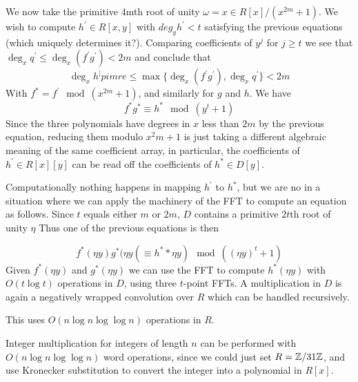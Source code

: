 We now take the primitive 4mth root of unity $\omega = x \in R[x] / (x^{2m} + 1)$. We wish to compute $h^\prime \in R[x, y]$ with $deg_y h^\prime < t$ satisfying the previous equations (which uniquely determines it?). Comparing coefficients of $y^j$ for $j \ge t$ we see that $\deg_x q^\prime \le \deg_x (f^\prime g^\prime) < 2m$ and conclude that 
\[
    \deg_x h^|pimre \le \max \{ \deg_x(f^\prime g^\prime), \deg_x q^\prime \} < 2m
\]
With $f^\ast = f^\prime \mod (x^{2m} + 1)$, and similarly for $g$ and $h$. We have
\[
    f^\ast g^\ast \equiv h^\ast \mod (y^t + 1) 
\]
Since the three polynomials have degrees in $x$ less than $2m$ by the previous equation, reducing them modulo $x^2m + 1$ is just taking a different algebraic meaning of the same coefficient array, in particular, the coefficients of $h^\prime \in R[x][y]$ can be read off the coefficients of $h^\ast \in D[y]$.

Computationally nothing happens in mapping $h^\prime$ to $h^\ast$, but we are no in a situation where we can apply the machinery of the FFT to compute an equation as follows. Since $t$ equals either $m$ or $2m$, $D$ contains a primitive $2t$th root of unity $\eta$
Thus one of the previous equations is then

\[
    f^\ast(\eta y)g^\ast(\eta y( \equiv h^\ast*\eta y) \mod ((\eta y)^t + 1)
\]
Given $f^\ast(\eta y)$ and $g^\ast(\eta y)$ we can use the FFT to compute $h^\ast(\eta y)$ with $O(t \log t)$ operations in $D$, using three $t$-point FFTs. A multiplication in $D$ is again a negatively wrapped convolution over $R$ which can be handled recursively.

This uses $O(n \log n \log \log n)$ operations in $R$.

Integer multiplication for integers of length $n$ can be performed with $O(n \log n \log \log n)$ word operations, since we could just set $R = {\mathbb Z} / 31{\mathbb Z}$, and use Kronecker substitution to convert the integer into a polynomial in $R[x]$.
